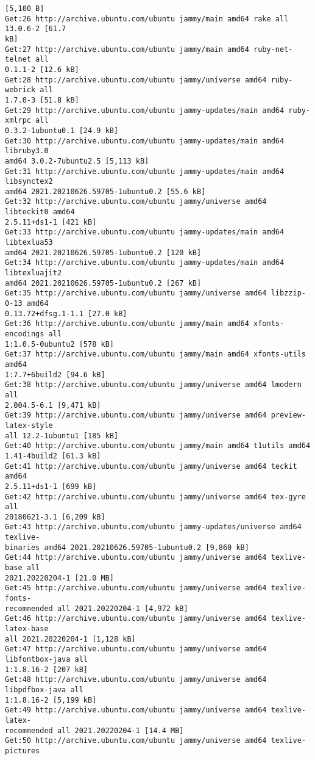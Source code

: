 \documentclass[11pt]{article}
\begin{document}
\begin{Verbatim}[commandchars=\\\{\}]
[5,100 B]
Get:26 http://archive.ubuntu.com/ubuntu jammy/main amd64 rake all 13.0.6-2 [61.7
kB]
Get:27 http://archive.ubuntu.com/ubuntu jammy/main amd64 ruby-net-telnet all
0.1.1-2 [12.6 kB]
Get:28 http://archive.ubuntu.com/ubuntu jammy/universe amd64 ruby-webrick all
1.7.0-3 [51.8 kB]
Get:29 http://archive.ubuntu.com/ubuntu jammy-updates/main amd64 ruby-xmlrpc all
0.3.2-1ubuntu0.1 [24.9 kB]
Get:30 http://archive.ubuntu.com/ubuntu jammy-updates/main amd64 libruby3.0
amd64 3.0.2-7ubuntu2.5 [5,113 kB]
Get:31 http://archive.ubuntu.com/ubuntu jammy-updates/main amd64 libsynctex2
amd64 2021.20210626.59705-1ubuntu0.2 [55.6 kB]
Get:32 http://archive.ubuntu.com/ubuntu jammy/universe amd64 libteckit0 amd64
2.5.11+ds1-1 [421 kB]
Get:33 http://archive.ubuntu.com/ubuntu jammy-updates/main amd64 libtexlua53
amd64 2021.20210626.59705-1ubuntu0.2 [120 kB]
Get:34 http://archive.ubuntu.com/ubuntu jammy-updates/main amd64 libtexluajit2
amd64 2021.20210626.59705-1ubuntu0.2 [267 kB]
Get:35 http://archive.ubuntu.com/ubuntu jammy/universe amd64 libzzip-0-13 amd64
0.13.72+dfsg.1-1.1 [27.0 kB]
Get:36 http://archive.ubuntu.com/ubuntu jammy/main amd64 xfonts-encodings all
1:1.0.5-0ubuntu2 [578 kB]
Get:37 http://archive.ubuntu.com/ubuntu jammy/main amd64 xfonts-utils amd64
1:7.7+6build2 [94.6 kB]
Get:38 http://archive.ubuntu.com/ubuntu jammy/universe amd64 lmodern all
2.004.5-6.1 [9,471 kB]
Get:39 http://archive.ubuntu.com/ubuntu jammy/universe amd64 preview-latex-style
all 12.2-1ubuntu1 [185 kB]
Get:40 http://archive.ubuntu.com/ubuntu jammy/main amd64 t1utils amd64
1.41-4build2 [61.3 kB]
Get:41 http://archive.ubuntu.com/ubuntu jammy/universe amd64 teckit amd64
2.5.11+ds1-1 [699 kB]
Get:42 http://archive.ubuntu.com/ubuntu jammy/universe amd64 tex-gyre all
20180621-3.1 [6,209 kB]
Get:43 http://archive.ubuntu.com/ubuntu jammy-updates/universe amd64 texlive-
binaries amd64 2021.20210626.59705-1ubuntu0.2 [9,860 kB]
Get:44 http://archive.ubuntu.com/ubuntu jammy/universe amd64 texlive-base all
2021.20220204-1 [21.0 MB]
Get:45 http://archive.ubuntu.com/ubuntu jammy/universe amd64 texlive-fonts-
recommended all 2021.20220204-1 [4,972 kB]
Get:46 http://archive.ubuntu.com/ubuntu jammy/universe amd64 texlive-latex-base
all 2021.20220204-1 [1,128 kB]
Get:47 http://archive.ubuntu.com/ubuntu jammy/universe amd64 libfontbox-java all
1:1.8.16-2 [207 kB]
Get:48 http://archive.ubuntu.com/ubuntu jammy/universe amd64 libpdfbox-java all
1:1.8.16-2 [5,199 kB]
Get:49 http://archive.ubuntu.com/ubuntu jammy/universe amd64 texlive-latex-
recommended all 2021.20220204-1 [14.4 MB]
Get:50 http://archive.ubuntu.com/ubuntu jammy/universe amd64 texlive-pictures

\end{Verbatim}
\end{document}
